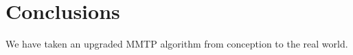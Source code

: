 \section{Conclusions}
\label{sec:conclusion}

We have taken an upgraded MMTP algorithm from conception to the real world.

